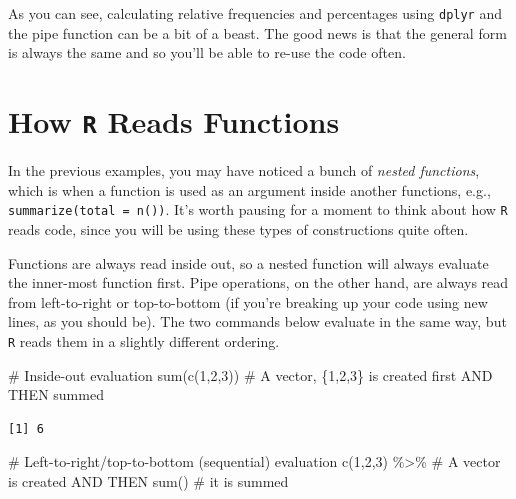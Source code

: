 \documentclass[
  letterpaper,
]{book}
\newenvironment{Shaded}{\begin{snugshade}}{\end{snugshade}}
\newcommand{\CommentTok}[1]{\textcolor[rgb]{0.37,0.37,0.37}{#1}}
\newcommand{\DecValTok}[1]{\textcolor[rgb]{0.68,0.00,0.00}{#1}}
\newcommand{\FunctionTok}[1]{\textcolor[rgb]{0.28,0.35,0.67}{#1}}
\newcommand{\NormalTok}[1]{\textcolor[rgb]{0.00,0.23,0.31}{#1}}
\newcommand{\SpecialCharTok}[1]{\textcolor[rgb]{0.37,0.37,0.37}{#1}}
\begin{document}
As you can see, calculating relative frequencies and percentages using
\texttt{dplyr} and the pipe function can be a bit of a beast. The good
news is that the general form is always the same and so you'll be able
to re-use the code often.

\hypertarget{how-r-reads-functions}{%
\section{\texorpdfstring{How \texttt{R} Reads
Functions}{How R Reads Functions}}\label{how-r-reads-functions}}

In the previous examples, you may have noticed a bunch of \emph{nested
functions}, which is when a function is used as an argument inside
another functions, e.g., \texttt{summarize(total\ =\ n())}. It's worth
pausing for a moment to think about how \texttt{R} reads code, since you
will be using these types of constructions quite often.

Functions are always read inside out, so a nested function will always
evaluate the inner-most function first. Pipe operations, on the other
hand, are always read from left-to-right or top-to-bottom (if you're
breaking up your code using new lines, as you should be). The two
commands below evaluate in the same way, but \texttt{R} reads them in a
slightly different ordering.

\begin{Shaded}
\begin{Highlighting}[]
\CommentTok{\# Inside{-}out evaluation}
\FunctionTok{sum}\NormalTok{(}\FunctionTok{c}\NormalTok{(}\DecValTok{1}\NormalTok{,}\DecValTok{2}\NormalTok{,}\DecValTok{3}\NormalTok{))               }\CommentTok{\# A vector, \{1,2,3\} is created first AND THEN summed}
\end{Highlighting}
\end{Shaded}

\begin{verbatim}
[1] 6
\end{verbatim}

\begin{Shaded}
\begin{Highlighting}[]
\CommentTok{\# Left{-}to{-}right/top{-}to{-}bottom (sequential) evaluation}
\FunctionTok{c}\NormalTok{(}\DecValTok{1}\NormalTok{,}\DecValTok{2}\NormalTok{,}\DecValTok{3}\NormalTok{) }\SpecialCharTok{\%\textgreater{}\%}                \CommentTok{\# A vector is created AND THEN}
  \FunctionTok{sum}\NormalTok{()                     }\CommentTok{\# it is summed}
\end{Highlighting}
\end{Shaded}
\end{document}
